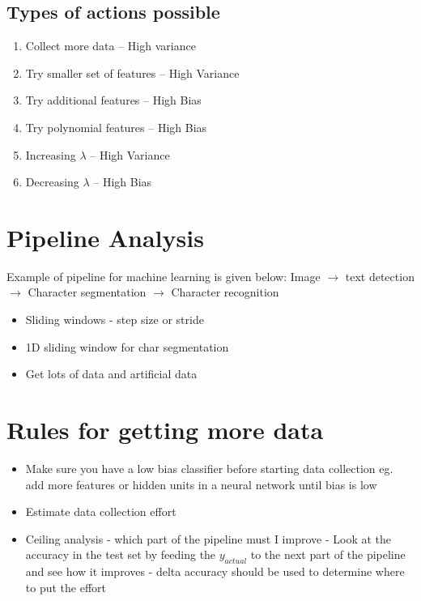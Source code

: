 \documentclass[12pt,a4paper]{article}
\begin{document}
\subsection{Types of actions possible}
\begin{enumerate}
\item Collect more data -- High variance
\item Try smaller set of features -- High Variance
\item Try additional features -- High Bias
\item Try polynomial features -- High Bias
\item Increasing $\lambda$ -- High Variance
\item Decreasing $\lambda$ -- High Bias
\end{enumerate}



\section{Pipeline Analysis}
Example of pipeline for machine learning is given below:
Image $\rightarrow$ text detection $\rightarrow$ Character segmentation $\rightarrow$ Character recognition


\begin{itemize}
\item Sliding windows - step size or stride
\item 1D sliding window for char segmentation
\item Get lots of data and artificial data
\end{itemize}

\section{Rules for getting more data}
\begin{itemize}
\item Make sure you have a low bias classifier before starting data collection eg. add more features or hidden units in a neural network until bias is low
\item Estimate data collection effort
\item Ceiling analysis - which part of the pipeline must I improve - Look at the accuracy in the test set by feeding the $y_{actual}$ to the next part of the pipeline and see how it improves - delta accuracy should be used to determine where to put the effort
\end{itemize}
\end{document}
